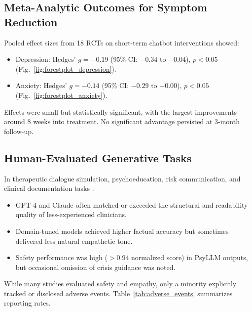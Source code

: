 \documentclass[journal]{IEEEtran}
\begin{document}
\subsection{Meta-Analytic Outcomes for Symptom Reduction}
Pooled effect sizes from 18 RCTs on short-term chatbot interventions \citep{Zhong2024} showed:
\begin{itemize}
    \item Depression: Hedges' $g = -0.19$ (95\% CI: $-0.34$ to $-0.04$), $p < 0.05$ (Fig.~\ref{fig:forestplot_depression}).
    \item Anxiety: Hedges' $g = -0.14$ (95\% CI: $-0.29$ to $-0.00$), $p < 0.05$ (Fig.~\ref{fig:forestplot_anxiety}).
\end{itemize}
Effects were small but statistically significant, with the largest improvements around 8 weeks into treatment. No significant advantage persisted at 3-month follow-up.

\subsection{Human-Evaluated Generative Tasks}
In therapeutic dialogue simulation, psychoeducation, risk communication, and clinical documentation tasks \citep{Hua2024b}:
\begin{itemize}
    \item GPT-4 and Claude often matched or exceeded the structural and readability quality of less-experienced clinicians.
    \item Domain-tuned models achieved higher factual accuracy but sometimes delivered less natural empathetic tone.
    \item Safety performance was high ($>0.94$ normalized score) in PsyLLM outputs, but occasional omission of crisis guidance was noted.
\end{itemize}

While many studies evaluated safety and empathy, only a minority explicitly tracked or disclosed adverse events.  
Table~\ref{tab:adverse_events} summarizes reporting rates.

\begin{table}[htbp]
\centering
\caption{Adverse event reporting across included studies}
\label{tab:adverse_events}
\end{table}
\end{document}
